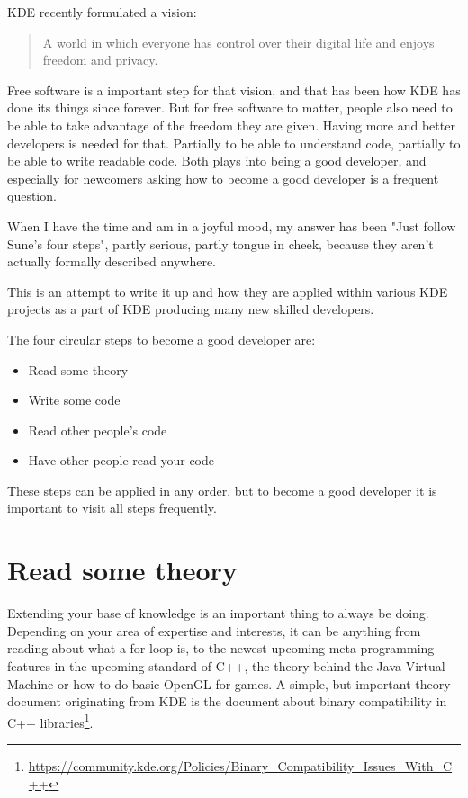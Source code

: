 

\noindent{}KDE recently formulated a vision:
\begin{quote}
A world in which everyone has control over their digital life and enjoys freedom and privacy.
\end{quote}

Free software is a important step for that vision, and that has been how KDE has done its things since forever. But for free software to matter, people also need to be able to take advantage of the freedom they are given. Having more and better developers is needed for that. Partially to be able to understand code, partially to be able to write readable code. Both plays into being a good developer, and especially for newcomers asking how to become a good developer is a frequent question.

When I have the time and am in a joyful mood, my answer has been "Just follow Sune's four steps", partly serious, partly tongue in cheek, because they aren't actually formally described anywhere.

This is an attempt to write it up and how they are applied within various KDE projects as a part of KDE producing many new skilled developers.

The four circular steps to become a good developer are:
\begin{itemize}
 \item Read some theory
 \item Write some code
 \item Read other people's code
 \item Have other people read your code
\end{itemize}

These steps can be applied in any order, but to become a good developer it is important to visit all steps frequently.

\section*{Read some theory}
Extending your base of knowledge is an important thing to always be doing. Depending on your area of expertise and interests, it can be anything from reading about what a for-loop is, to the newest upcoming meta programming features in the upcoming standard of C++, the theory behind the Java Virtual Machine or how to do basic OpenGL for games. A simple, but important theory document originating from KDE is the document about binary compatibility in C++ libraries\footnote{\url{https://community.kde.org/Policies/Binary_Compatibility_Issues_With_C++}}.

